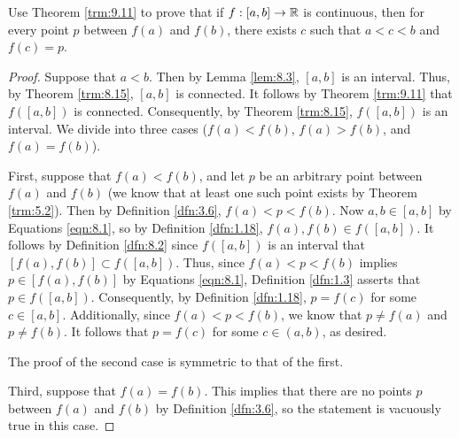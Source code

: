 \documentclass[../main.tex]{subfiles}
\begin{document}
\begin{exercise}\label{exr:9.12}
    Use Theorem \ref{trm:9.11} to prove that if $f:[a,b]\to\mathbb{R}$ is continuous, then for every point $p$ between $f(a)$ and $f(b)$, there exists $c$ such that $a<c<b$ and $f(c)=p$.
    \begin{proof}
        Suppose that $a<b$. Then by Lemma \ref{lem:8.3}, $[a,b]$ is an interval. Thus, by Theorem \ref{trm:8.15}, $[a,b]$ is connected. It follows by Theorem \ref{trm:9.11} that $f([a,b])$ is connected. Consequently, by Theorem \ref{trm:8.15}, $f([a,b])$ is an interval. We divide into three cases ($f(a)<f(b)$, $f(a)>f(b)$, and $f(a)=f(b)$).\par
        First, suppose that $f(a)<f(b)$, and let $p$ be an arbitrary point between $f(a)$ and $f(b)$ (we know that at least one such point exists by Theorem \ref{trm:5.2}). Then by Definition \ref{dfn:3.6}, $f(a)<p<f(b)$. Now $a,b\in[a,b]$ by Equations \ref{eqn:8.1}, so by Definition \ref{dfn:1.18}, $f(a),f(b)\in f([a,b])$. It follows by Definition \ref{dfn:8.2} since $f([a,b])$ is an interval that $[f(a),f(b)]\subset f([a,b])$. Thus, since $f(a)<p<f(b)$ implies $p\in[f(a),f(b)]$ by Equations \ref{eqn:8.1}, Definition \ref{dfn:1.3} asserts that $p\in f([a,b])$. Consequently, by Definition \ref{dfn:1.18}, $p=f(c)$ for some $c\in[a,b]$. Additionally, since $f(a)<p<f(b)$, we know that $p\neq f(a)$ and $p\neq f(b)$. It follows that $p=f(c)$ for some $c\in(a,b)$, as desired.\par
        The proof of the second case is symmetric to that of the first.\par
        Third, suppose that $f(a)=f(b)$. This implies that there are no points $p$ between $f(a)$ and $f(b)$ by Definition \ref{dfn:3.6}, so the statement is vacuously true in this case.
    \end{proof}
\end{exercise}
\end{document}
